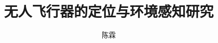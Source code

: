 \documentclass[bachelor]{ustcthesis}
\title{无人飞行器的定位与环境感知研究}
\author{陈霖}
\begin{document}
%

\maketitle
\makestatement

\frontmatter

\tableofcontents


\mainmatter










\appendix


\backmatter


\end{document}
